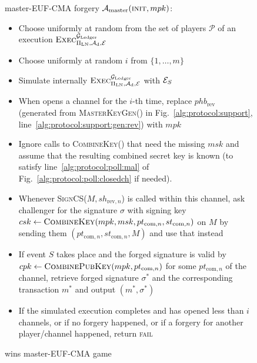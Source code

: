   \begin{figure}[H]
    \begin{algobox}{\textsf{master-EUF-CMA} forgery}
      $\mathcal{A}_{\mathrm{master}}(\textsc{init}, mpk)$:
      \begin{itemize}
        \item Choose uniformly at random \alice{} from the set of players
        $\mathcal{P}$ of an execution
        $\textsc{Exec}^{\mathcal{G}_{\mathrm{Ledger}}}_{\Pi_{\mathrm{LN}}, \mathcal{A}_{\mathrm{d}},
        \mathcal{E}}$
        \item Choose uniformly at random $i$ from $\{1, \dots, m\}$
        \item Simulate internally
        $\textsc{Exec}^{\mathcal{G}_{\mathrm{Ledger}}}_{\Pi_{\mathrm{LN}}, \mathcal{A}_{\mathrm{d}},
        \mathcal{E}}$ with $\mathcal{E}_S$
        \item When \alice{} opens a channel for the $i$-th time,
        replace $phb_{\mathrm{rev}}$ (generated from \textsc{MasterKeyGen}() in
        Fig.~\ref{alg:protocol:support},
        line~\ref{alg:protocol:support:gen:rev}) with $mpk$
        \item Ignore calls to \textsc{CombineKey}() that need the missing $msk$
        and assume that the resulting combined secret key is known (to satisfy
        line~\ref{alg:protocol:poll:mal} of
        Fig.~\ref{alg:protocol:poll:closedch} if needed).
        \item Whenever \textsc{SignCS}($M, sh_{\mathrm{rev}, n}$) is called
        within this channel, ask challenger for the signature $\sigma$ with
        signing key $csk \gets \textsc{CombineKey}(mpk, msk, pt_{\mathrm{com},
        n}, st_{\mathrm{com}, n})$ on $M$ by sending them $(pt_{\mathrm{com},
        n}, st_{\mathrm{com}, n}, M)$ and use that instead
        \item If event $S$ takes place and the forged signature is valid by $cpk
        \gets \textsc{CombinePubKey}(mpk, pt_{\mathrm{com}, n})$ for some
        $pt_{\mathrm{com}, n}$ of the channel, retrieve forged signature
        $\sigma^*$ and the corresponding transaction $m^*$ and output $(m^*,
        \sigma^*)$
        \item If the simulated execution completes and \alice{} has opened less
        than $i$ channels, or if no forgery happened, or if a forgery for
        another player/channel happened, return \textsc{fail}
      \end{itemize}
    \end{algobox}
    \caption{wins \textsf{master-EUF-CMA} game}
    \label{alg:forge:master}
  \end{figure}

